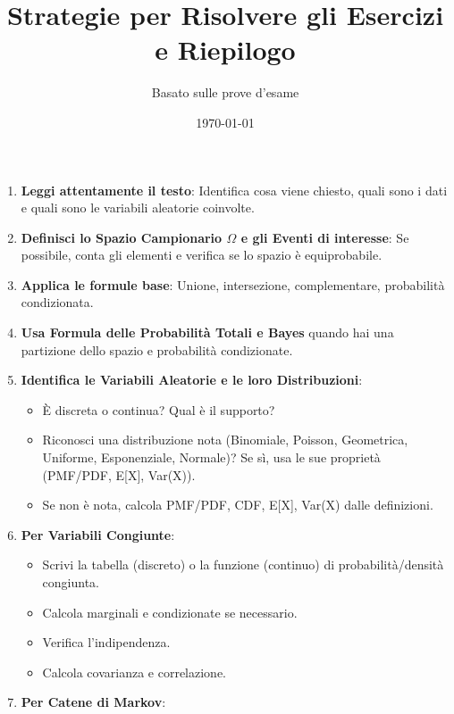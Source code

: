 

\title{Strategie per Risolvere gli Esercizi e Riepilogo}
\author{Basato sulle prove d'esame}
\date{\today}



\maketitle
\tableofcontents
\newpage

\begin{enumerate}
    \item \textbf{Leggi attentamente il testo}: Identifica cosa viene chiesto, quali sono i dati e quali sono le variabili aleatorie coinvolte.
    \item \textbf{Definisci lo Spazio Campionario $\Omega$ e gli Eventi di interesse}: Se possibile, conta gli elementi e verifica se lo spazio è equiprobabile.
    \item \textbf{Applica le formule base}: Unione, intersezione, complementare, probabilità condizionata.
    \item \textbf{Usa Formula delle Probabilità Totali e Bayes} quando hai una partizione dello spazio e probabilità condizionate.
    \item \textbf{Identifica le Variabili Aleatorie e le loro Distribuzioni}:
        \begin{itemize}
            \item È discreta o continua? Qual è il supporto?
            \item Riconosci una distribuzione nota (Binomiale, Poisson, Geometrica, Uniforme, Esponenziale, Normale)? Se sì, usa le sue proprietà (PMF/PDF, E[X], Var(X)).
            \item Se non è nota, calcola PMF/PDF, CDF, E[X], Var(X) dalle definizioni.
        \end{itemize}
    \item \textbf{Per Variabili Congiunte}:
        \begin{itemize}
            \item Scrivi la tabella (discreto) o la funzione (continuo) di probabilità/densità congiunta.
            \item Calcola marginali e condizionate se necessario.
            \item Verifica l'indipendenza.
            \item Calcola covarianza e correlazione.
        \end{itemize}
    \item \textbf{Per Catene di Markov}:

\end{enumerate}
